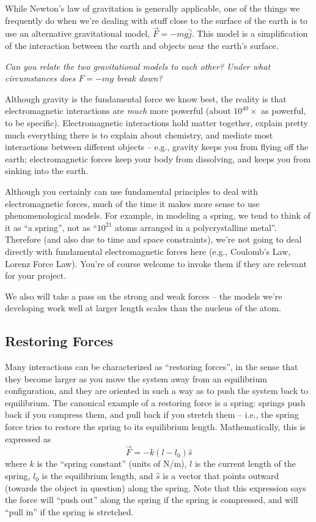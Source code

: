 While Newton's law of gravitation is generally applicable, one of the things we frequently do when we're dealing with stuff close to the surface of the earth is to use an alternative gravitational model, 
 $\vec{F} = -mg\hat{j}$.  This model is a simplification of the interaction between the earth and objects near the earth's surface.
 

{\it Can you relate the two gravitational models to each other?  Under what circumstances does $F=-mg$ break down?}

Although gravity is the fundamental force we know best, the reality is that electromagnetic interactions are {\it much} more powerful (about $10^{40} \times$ as powerful, to be specific).  Electromagnetic interactions hold matter together, explain pretty much everything there is to explain about chemistry, and mediate most interactions between different objects -- e.g., gravity keeps you from flying off the earth; electromagnetic forces keep your body from dissolving, and keeps you from sinking into the earth.
 
Although you certainly can use fundamental principles to deal with electromagnetic forces, much of the time it makes more sense to use phenomenological models.  For example, in modeling a spring, we tend to think of it as ``a spring'', not as ``$10^{21}$ atoms arranged in a polycrystalline metal''.  Therefore (and also  due to time and space constraints), we're not going to deal directly with fundamental electromagnetic forces here (e.g., Coulomb's Law, Lorenz Force Law).   You're of course welcome to invoke them if they are relevant for your project.

We also will take a pass on the strong and weak forces -- the models we're developing work well at larger length scales than the nucleus of the atom.
 
 \subsection{Restoring Forces}
Many interactions can be characterized as ``restoring forces'', in the sense that they become larger as you move the system away from an equilibrium configuration, and they are oriented in such a way as to push the system back to equilibrium.  The canonical example of a restoring force is a spring:  springs push back if you compress them, and pull back if you stretch them  -- i.e., the spring force tries to restore the spring to its equilibrium length.  Mathematically, this is expressed as 
$$\vec{F} = - k(l-l_0) \hat{s}$$
where $k$ is the ``spring constant'' (units of N/m), $l$ is the current length of the spring, $l_0$ is the equilibrium length, and $\hat{s}$ is a vector that points outward (towards the object in question) along the spring. Note that this expression says the force will ``push out'' along the spring if the spring is compressed, and will ``pull in'' if the spring is stretched.  

